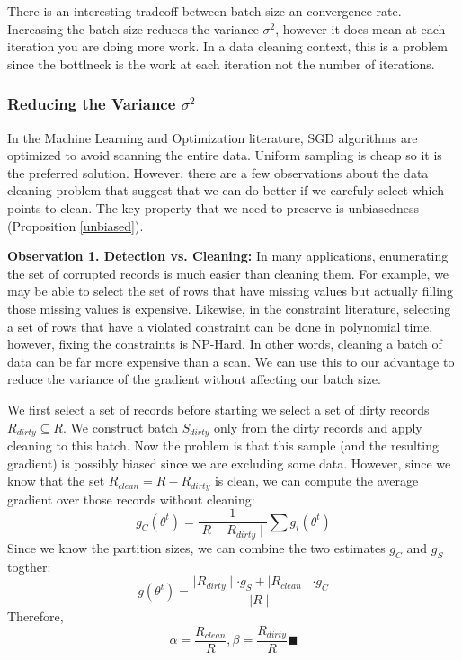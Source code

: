 There is an interesting tradeoff between batch size an convergence rate.
Increasing the batch size reduces the variance $\sigma^2$, however it does
mean at each iteration you are doing more work.
In a data cleaning context, this is a problem since the bottlneck is the work at 
each iteration not the number of iterations.

\subsubsection{Reducing the Variance $\sigma^2$}\label{dist-samp}
In the Machine Learning and Optimization literature, SGD algorithms are optimized to avoid scanning the entire data.
Uniform sampling is cheap so it is the preferred solution.
However, there are a few observations about the data cleaning problem that suggest that we can do better if we carefuly select which points to clean.
The key property that we need to preserve is unbiasedness (Proposition \ref{unbiased}).

\vspace{0.5em}

\noindent\textbf{Observation 1. Detection vs. Cleaning: } In many applications, enumerating the set of corrupted records is much easier than cleaning them. For example, we may be able to select the set of rows that have missing values but actually filling those missing values is expensive. Likewise, in the constraint literature, selecting a set of rows that have a violated constraint can be done in polynomial time, however, fixing the constraints is NP-Hard.
In other words, cleaning a batch of data can be far more expensive than a scan.
We can use this to our advantage to reduce the variance of the gradient without affecting our batch size.

We first select a set of records before starting we select a set of dirty records $R_{dirty} \subseteq R$. 
We construct batch $S_{dirty}$ only from the dirty records and apply cleaning to this batch.
Now the problem is that this sample (and the resulting gradient) is possibly biased since we are excluding some data.
However, since we know that the set $R_{clean} = R - R_{dirty}$ is clean, we can compute the average gradient over those records without cleaning:
\[
g_C(\theta^{t}) = \frac{1}{\mid R - R_{dirty} \mid} \sum g_i(\theta^{t})
\]
Since we know the partition sizes, we can combine the two estimates $g_C$ and $g_S$ togther:
\[
g(\theta^{t}) = \frac{\mid R_{dirty} \mid \cdot g_S + \mid R_{clean} \mid \cdot g_C  }{\mid R \mid}
\]
Therefore,
\[
\alpha = \frac{R_{clean}}{R}, \beta = \frac{R_{dirty}}{R} \blacksquare
\]

